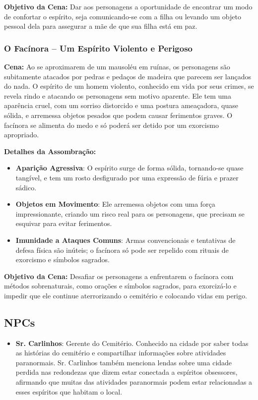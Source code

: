 \textbf{Objetivo da Cena:} Dar aos personagens a oportunidade de encontrar um modo de confortar o espírito, seja comunicando-se com a filha ou levando um objeto pessoal dela para assegurar a mãe de que sua filha está em paz.

\subsubsection{O Facínora – Um Espírito Violento e Perigoso}

\textbf{Cena:} Ao se aproximarem de um mausoléu em ruínas, os personagens são subitamente atacados por pedras e pedaços de madeira que parecem ser lançados do nada. O espírito de um homem violento, conhecido em vida por seus crimes, se revela rindo e atacando os personagens sem motivo aparente. Ele tem uma aparência cruel, com um sorriso distorcido e uma postura ameaçadora, quase sólida, e arremessa objetos pesados que podem causar ferimentos graves. O facínora se alimenta do medo e só poderá ser detido por um exorcismo apropriado.

\textbf{Detalhes da Assombração:}
\begin{itemize}
    \item \textbf{Aparição Agressiva}: O espírito surge de forma sólida, tornando-se quase tangível, e tem um rosto desfigurado por uma expressão de fúria e prazer sádico.
    \item \textbf{Objetos em Movimento}: Ele arremessa objetos com uma força impressionante, criando um risco real para os personagens, que precisam se esquivar para evitar ferimentos.
    \item \textbf{Imunidade a Ataques Comuns}: Armas convencionais e tentativas de defesa física são inúteis; o facínora só pode ser repelido com rituais de exorcismo e símbolos sagrados.
\end{itemize}

\textbf{Objetivo da Cena:} Desafiar os personagens a enfrentarem o facínora com métodos sobrenaturais, como orações e símbolos sagrados, para exorcizá-lo e impedir que ele continue aterrorizando o cemitério e colocando vidas em perigo.


\subsection{NPCs}

\begin{itemize}
    \item \textbf{Sr. Carlinhos}: Gerente do Cemitério. Conhecido na cidade por saber todas as histórias do cemitério e compartilhar informações sobre atividades paranormais. Sr. Carlinhos também menciona lendas sobre uma cidade perdida nas redondezas que dizem estar conectada a espíritos obsessores, afirmando que muitas das atividades paranormais podem estar relacionadas a esses espíritos que habitam o local.
\end{itemize}




